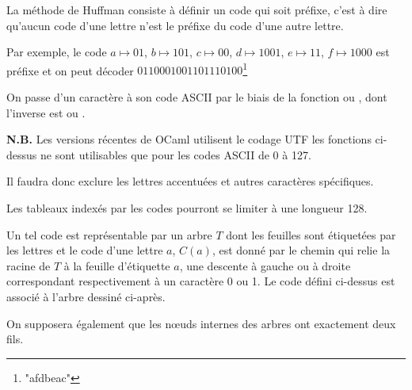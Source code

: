 La méthode de Huffman consiste à définir un code qui soit préfixe, c'est à dire qu'aucun code d'une lettre n'est le préfixe du code d'une autre lettre.

Par exemple, le code $a\mapsto 01$, $b\mapsto 101$, $c\mapsto 00$, $d\mapsto 1001$, $e\mapsto 11$, $f\mapsto 1000$ est préfixe et on peut décoder $0110001001101110100$\footnote{"afdbeac"}

\medskip

On passe d'un caractère à son code ASCII par le biais de la fonction  ou , dont l'inverse est   ou . 

{\bf N.B.} Les versions récentes de OCaml utilisent le codage UTF les fonctions ci-dessus ne sont utilisables que pour les codes ASCII de 0 à 127. 

Il faudra donc exclure les lettres accentuées et autres caractères spécifiques. 

Les tableaux indexés par les codes pourront se limiter à une longueur 128.

\medskip  

Un tel code est représentable par un arbre $T$ dont les feuilles sont étiquetées par les lettres et le code d'une lettre $a$, $C(a)$, est donné par le chemin qui relie la racine de $T$ à la feuille d'étiquette $a$, une descente à gauche ou à droite correspondant respectivement à un caractère 0 ou 1. Le code défini ci-dessus est associé à l'arbre dessiné ci-après.

On supposera également que les nœuds internes des arbres ont exactement deux fils.

